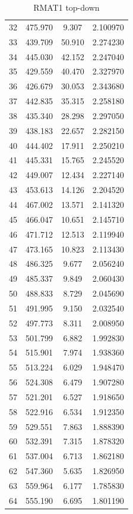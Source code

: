 \documentclass[10pt,twocolumn,letterpaper]{article}
\begin{document}
\begin{table}[h]
\begin{tabular}{@{}c|ccc@{}}
32 & 475.970 & 9.307 & 2.100970 \\
33 & 439.709 & 50.910 & 2.274230 \\
34 & 445.030 & 42.152 & 2.247040 \\
35 & 429.559 & 40.470 & 2.327970 \\
36 & 426.679 & 30.053 & 2.343680 \\
37 & 442.835 & 35.315 & 2.258180 \\
38 & 435.340 & 28.298 & 2.297050 \\
39 & 438.183 & 22.657 & 2.282150 \\
40 & 444.402 & 17.911 & 2.250210 \\
41 & 445.331 & 15.765 & 2.245520 \\
42 & 449.007 & 12.434 & 2.227140 \\
43 & 453.613 & 14.126 & 2.204520 \\
44 & 467.002 & 13.571 & 2.141320 \\
45 & 466.047 & 10.651 & 2.145710 \\
46 & 471.712 & 12.513 & 2.119940 \\
47 & 473.165 & 10.823 & 2.113430 \\
48 & 486.325 & 9.677 & 2.056240 \\
49 & 485.337 & 9.849 & 2.060430 \\
50 & 488.833 & 8.729 & 2.045690 \\
51 & 491.995 & 9.150 & 2.032540 \\
52 & 497.773 & 8.311 & 2.008950 \\
53 & 501.799 & 6.882 & 1.992830 \\
54 & 515.901 & 7.974 & 1.938360 \\
55 & 513.224 & 6.029 & 1.948470 \\
56 & 524.308 & 6.479 & 1.907280 \\
57 & 521.201 & 6.527 & 1.918650 \\
58 & 522.916 & 6.534 & 1.912350 \\
59 & 529.551 & 7.863 & 1.888390 \\
60 & 532.391 & 7.315 & 1.878320 \\
61 & 537.004 & 6.713 & 1.862180 \\
62 & 547.360 & 5.635 & 1.826950 \\
63 & 559.964 & 6.177 & 1.785830 \\
64 & 555.190 & 6.695 & 1.801190 \\
\bottomrule
\end{tabular}
\caption{RMAT1 top-down}
\end{table}
\end{document}
